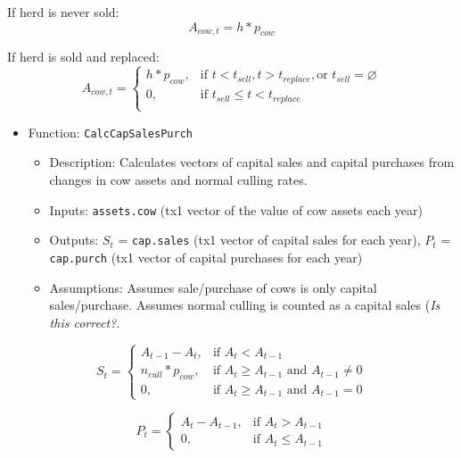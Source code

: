 \documentclass[11pt]{article}
\begin{document}
If herd is never sold:
\begin{equation}
A_{cow,t} = h * p_{cow}
\end{equation}

If herd is sold and replaced:
\begin{equation}
A_{cow,t} =  
\begin{cases}
h * p_{cow}, & \text{if  } t < t_{sell},  t > t_{replace}, \text{or } t_{sell} = \varnothing \\
0, & \text{if  } t_{sell} \le t < t_{replace} \\
\end{cases}
\end{equation}

\begin{itemize}
\item Function: \verb!CalcCapSalesPurch!
	\begin{itemize}
	\item Description: Calculates vectors of capital sales and capital purchases from changes in cow assets and normal culling rates. 
  	\item Inputs: \verb!assets.cow! (tx1 vector of the value of cow assets each year)
  	\item Outputs: $S_t$ = \verb!cap.sales! (tx1 vector of capital sales for each year), $P_t$ = \verb!cap.purch! (tx1 vector of capital purchases for each year)
  	\item Assumptions: Assumes sale/purchase of cows is only capital sales/purchase. Assumes normal culling is counted as a capital sales (\textit{Is this correct?}.
	\end{itemize}
\end{itemize}

\begin{equation}
S_t =
\begin{cases}
A_{t-1} - A_{t}, & \text{if  } A_t < A_{t-1} \\
n_{cull} * p_{cow}, & \text{if } A_t \geq A_{t-1} \text{ and } A_{t-1} \ne 0 \\
0, & \text{if } A_t \ge A_{t-1} \text{ and } A_{t-1} = 0
\end{cases} 
\end{equation}

\begin{equation}
P_t =
\begin{cases}
A_t - A_{t-1}, & \text{if } A_t > A_{t-1} \\
0, & \text{if } A_t \le A_{t-1}
\end{cases} 
\end{equation}
\end{document}
